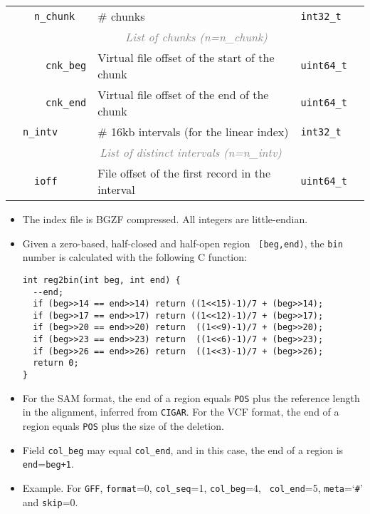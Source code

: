 \documentclass[10pt]{article}
\begin{document}
\begin{center}
\begin{tabular}{|l|l|l|l|l|l|l|}
\cline{3-7}
 & & \multicolumn{2}{l|}{\tt n\_chunk} & \# chunks & {\tt int32\_t} & \\
\cline{3-7}
 & & \multicolumn{5}{c|}{\textcolor{gray}{\it List of chunks (n=n\_chunk)}} \\
\cline{4-7}
 & & \hspace{0.1cm} & {\tt cnk\_beg} & Virtual file offset of the start of the chunk & {\tt uint64\_t} & \\
\cline{4-7}
 & & & {\tt cnk\_end} & Virtual file offset of the end of the chunk & {\tt uint64\_t} & \\
\cline{2-7}
 & \multicolumn{3}{l|}{\tt n\_intv} & \# 16kb intervals (for the linear index) & {\tt int32\_t} & \\
\cline{2-7}
 & \multicolumn{6}{c|}{\textcolor{gray}{\it List of distinct intervals (n=n\_intv)}} \\
\cline{3-7}
 & & \multicolumn{2}{l|}{\tt ioff} & File offset of the first record in the interval & {\tt uint64\_t} & \\
\hline
\end{tabular}
\end{center}

\begin{itemize}
\item The index file is BGZF compressed. All integers are little-endian.
\item Given a zero-based, half-closed and half-open region {\tt
    [beg,end)}, the {\tt bin} number is calculated with the following C
  function:
\begin{verbatim}
int reg2bin(int beg, int end) {
  --end;
  if (beg>>14 == end>>14) return ((1<<15)-1)/7 + (beg>>14);
  if (beg>>17 == end>>17) return ((1<<12)-1)/7 + (beg>>17);
  if (beg>>20 == end>>20) return  ((1<<9)-1)/7 + (beg>>20);
  if (beg>>23 == end>>23) return  ((1<<6)-1)/7 + (beg>>23);
  if (beg>>26 == end>>26) return  ((1<<3)-1)/7 + (beg>>26);
  return 0;
}
\end{verbatim}
\item For the SAM format, the end of a region equals {\tt POS} plus the
  reference length in the alignment, inferred from {\tt CIGAR}. For the
  VCF format, the end of a region equals {\tt POS} plus the size of the
  deletion.
\item Field {\tt col\_beg} may equal {\tt col\_end}, and in this case,
  the end of a region is {\tt end}={\tt beg+1}.
\item Example. For {\tt GFF}, {\tt format}=0, {\tt col\_seq}=1, {\tt col\_beg}=4, {\tt
    col\_end}=5, {\tt meta}=`{\tt \#}' and {\tt skip}=0.
\end{itemize}
\end{document}
